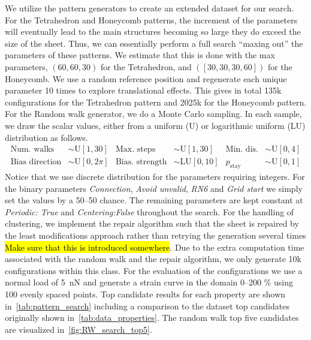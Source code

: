 We utilize the pattern generators to create an extended dataset for our search. For the Tetrahedron and Honeycomb patterns, the increment of the parameters will eventually lead to the main structures becoming so large they do exceed the size of the sheet. Thus, we can essentially perform a
full search ``maxing out'' the parameters of these patterns. We estimate
that this is done with the max parameters, $(60, 60, 30)$ for the Tetrahedron,
and $([30, 30, 30, 60])$ for the Honeycomb. We use a random reference position
and regenerate each unique parameter 10 times to explore translational effects. This gives in total 135k configurations for the
Tetrahedron pattern and 2025k for the Honeycomb pattern. For the Random walk
generator, we do a Monte Carlo sampling. In each sample, we draw the scalar values, either from a uniform (U) or logarithmic uniform (LU) distribution as follows.
\begin{align*}
  \text{Num. walks} &\sim \text{U}[1, 30] & \text{Max. steps} &\sim \text{U}[1,30]  & \text{Min. dis.} &\sim \text{U}[0,4] \\
  \text{Bias direction} &\sim \text{U}[0, 2\pi] & \text{Bias. strength} &\sim \text{LU}[0,10]  & p_{\text{stay}} &\sim \text{U}[0,1]  
\end{align*}
Notice that we use discrete distribution for the parameters requiring integers. For the binary parameters \textit{Connection}, \textit{Avoid unvalid},
\textit{RN6} and \textit{Grid start} we simply set the values by a 50--50 chance. The remaining parameters are kept constant at \textit{Periodic: True} and \textit{Centering:False} throughout the search. For the handling of clustering, we implement the repair algorithm such that the sheet is repaired by the least modifications approach rather than retrying the generation several times \hl{Make sure that this is introduced somewhere}. Due to the extra computation time associated with the
random walk and the repair algorithm, we only generate 10k configurations within
this class. For the evaluation of the configurations we use a normal load of \SI{5}{nN} and generate a strain curve in the domain 0--200 \% using 100 evenly spaced points. Top candidate results for each property are shown in~\cref{tab:pattern_search} including a comparison to the dataset top candidates
originally shown in~\cref{tab:data_properties}. The random walk top five candidates are visualized in~\cref{fig:RW_search_top5}.

